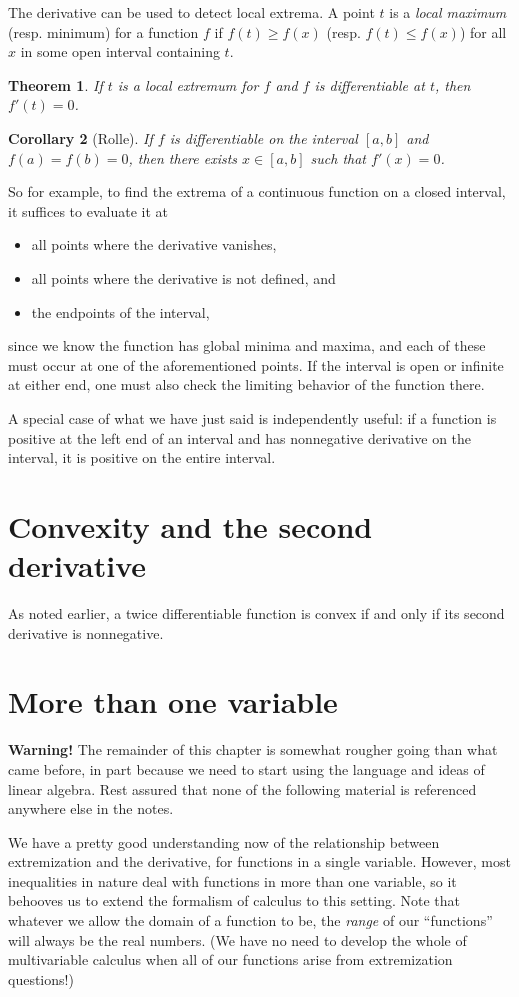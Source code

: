 \documentclass[12pt]{report}
\newtheorem{theorem}{Theorem}
\newtheorem{cor}[theorem]{Corollary}
\def\ii{\item}
\numberwithin{exc}{section}
\begin{document}
The derivative can be used to detect local extrema. A point $t$ is 
a \emph{local maximum} (resp. minimum) for a function $f$ if $f(t) \geq 
f(x)$ (resp. $f(t) \leq f(x)$) for all $x$ in some open interval 
containing $t$.
\begin{theorem}
	If $t$ is a local extremum for $f$ and $f$ is differentiable at $t$, 
	then $f'(t) = 0$.
\end{theorem}
\begin{cor}[Rolle]
If $f$ is differentiable on the interval $[a,b]$ and $f(a)=f(b)=0$, 
then there exists $x\in [a,b]$ such that $f'(x) = 0$.
\end{cor}

So for example, to find the extrema of a continuous function on a 
closed interval, it suffices to evaluate it at
\begin{itemize}
	\ii all points where the derivative vanishes,
	\ii all points where the derivative is not defined, and
	\ii the endpoints of the interval,
\end{itemize}
since we know the function has global minima and maxima, and each of these
must occur at one of the aforementioned points. If the interval 
is open or infinite at either end, one must also check the limiting 
behavior of the function there.

A special case of what we have just said is independently useful: if 
a function is positive at the left end of an interval and has 
nonnegative derivative on the interval, it is positive on the entire 
interval.

\section{Convexity and the second derivative}
As noted earlier, a twice differentiable function is convex if and 
only if its second derivative is nonnegative. 

\section{More than one variable}
\textbf{Warning!} The remainder of this chapter is somewhat rougher going than 
what came before, in part because we need to start using the language and 
ideas of linear algebra. Rest assured that none of the following 
material is referenced anywhere else in the notes.

We have a pretty good understanding now of the relationship between 
extremization and the derivative, for functions in a single variable. 
However, most inequalities in nature deal with functions in more than 
one variable, so it behooves us to extend the formalism of calculus 
to this setting. Note that whatever we allow the domain of a function 
to be, the \emph{range} of our ``functions'' will always be the real 
numbers. (We have no need to develop the whole of multivariable 
calculus when all of our functions arise from extremization 
questions!)
\end{document}
